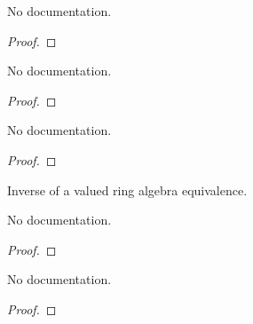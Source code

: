 \begin{theorem}\label{ValAlgEquiv.coe_refl}
        \leanok
                No documentation.
    \end{theorem}

\begin{proof}
    \leanok
\end{proof}

\begin{theorem}\label{ValRingEquiv.refl_apply}
        \leanok
                No documentation.
    \end{theorem}

\begin{proof}
    \leanok
\end{proof}

\begin{theorem}\label{ValRingEquiv.refl_toEquiv}
        \leanok
                No documentation.
    \end{theorem}

\begin{proof}
    \leanok
\end{proof}

\begin{definition}\label{ValAlgEquiv.symm}
        \leanok
                Inverse of a valued ring algebra equivalence.
    \end{definition}

\begin{theorem}\label{ValAlgEquiv.apply_symm_apply}
        \leanok
                No documentation.
    \end{theorem}

\begin{proof}
    \leanok
\end{proof}

\begin{theorem}\label{ValAlgEquiv.symm_apply_apply}
        \leanok
                No documentation.
    \end{theorem}

\begin{proof}
    \leanok
\end{proof}

